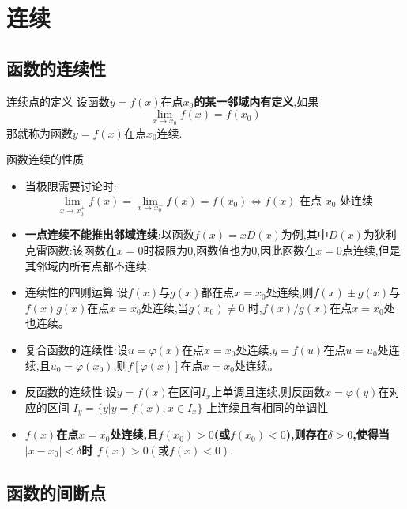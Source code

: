 \documentclass[8pt a4paper, oneside, UTF8]{ctexbook}
\begin{document}
\begin{sloppypar}
    \else
    \fi
    \chapter{连续}
    \section{函数的连续性}
    \begin{defn}{连续点的定义}{}
        设函数$y=f(x)$在点$x_0$\textbf{的某一邻域内有定义},如果
        $$
            \lim_{x\to x_0}f(x)=f(x_0)
        $$
        那就称为函数$y=f(x)$在点$x_0$连续.
    \end{defn}
    \begin{criterion}{函数连续的性质}{}
        \begin{itemize}
            \item 当极限需要讨论时:
                  $$
                      \lim_{x\to x_0^+}f\left(x\right)=\lim_{x\to x_0^-}f\left(x\right)=f\left(x_0\right)\Leftrightarrow f\left(x\right)\text{ 在点 }x_0\text{ 处连续}
                  $$
            \item \textbf{一点连续不能推出邻域连续}:以函数$f(x)=x D(x)$为例,其中$D(x)$为狄利克雷函数:该函数在$x=0$时极限为0,函数值也为0,因此函数在$x=0$点连续,但是其邻域内所有点都不连续.
            \item 连续性的四则运算:设$f(x)$与$g(x)$都在点$x=x_0$处连续,则$f(x)\pm g(x)$与$f(x)g(x)$在点$x=x_{0}$处连续,当$g(x_0)\neq0$ 时,$f(x)/g(x)$在点$x=x_{0}$处也连续。
            \item 复合函数的连续性:设$u=\varphi(x)$在点$x=x_0$处连续,$y=f(u)$在点$u=u_0$处连续,且$u_{0}=\varphi(x_{0})$,则$f\left[\varphi(x)\right]$在点$x=x_{0}$处连续。
            \item 反函数的连续性:设$y=f(x)$在区间$I_x$上单调且连续,则反函数$x=\varphi(y)$在对应的区间 $I_{y}=\{y|y=f(x),x\in I_{x}\}$ 上连续且有相同的单调性
            \item \textbf{$f(x)$在点$x=x_0$处连续,且$f(x_0)>0$(或$f(x_0)<0$),则存在$\delta>0$,使得当$|x-x_0|<\delta$时 $f\left(x\right)>0\left(\text{或}f\left(x\right)<0\right).$ }
        \end{itemize}
    \end{criterion}
    \section{函数的间断点}

\end{sloppypar}
\end{document}
